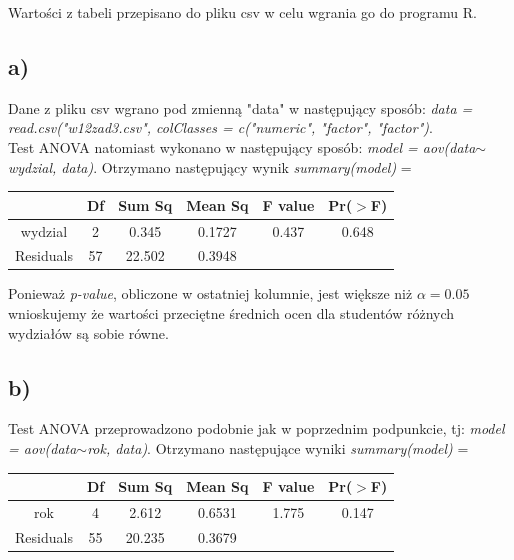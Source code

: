 \documentclass{article}
\begin{document}
Wartości z tabeli przepisano do pliku csv w celu wgrania go do programu R. 
\begin{center}
\scriptsize
{}
\end{center}

\subsection{a)}
Dane z pliku csv wgrano pod zmienną "data" w następujący sposób: \textit{data = read.csv("w12zad3.csv", colClasses = c("numeric", "factor", "factor")}. \\
Test ANOVA natomiast wykonano w następujący sposób: \textit{model = aov(data$\sim$wydzial, data)}. Otrzymano następujący wynik \textit{summary(model)} =
\begin{center} \begin{tabular}{|c|c|c|c|c|c|} \hline
& Df & Sum Sq & Mean Sq & F value & Pr($>$F) \\ \hline
wydzial & 2 & 0.345 & 0.1727 & 0.437 & 0.648 \\ \hline
Residuals & 57 & 22.502 & 0.3948 & & \\ \hline
\end{tabular} \end{center}

Ponieważ \textit{p-value}, obliczone w ostatniej kolumnie, jest większe niż $\alpha = 0.05$ wnioskujemy że wartości przeciętne średnich ocen dla studentów różnych wydziałów są sobie równe.

\subsection{b)}
Test ANOVA przeprowadzono podobnie jak w poprzednim podpunkcie, tj: \textit{model = aov(data$\sim$rok, data)}. Otrzymano następujące wyniki \textit{summary(model)} =
\begin{center} \begin{tabular}{|c|c|c|c|c|c|} \hline
& Df & Sum Sq & Mean Sq & F value & Pr($>$F) \\ \hline
rok & 4 & 2.612 & 0.6531 & 1.775 & 0.147 \\ \hline
Residuals & 55 & 20.235 & 0.3679 & & \\ \hline
\end{tabular} \end{center}
\end{document}
